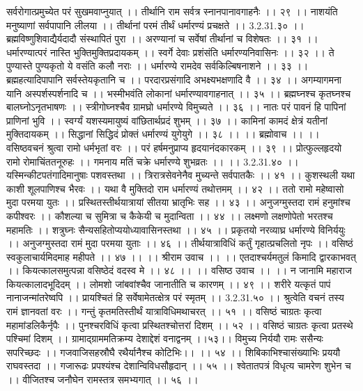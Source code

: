 सर्वरोगात्प्रमुच्येत परं सुखमवाप्नुयात् ।।
तीर्थानि राम सर्वत्र स्नानपानावगाहनैः ।। २९ ।।
नाशयंति मनुष्याणां सर्वपापानि लीलया ।।
तीर्थानां परमं तीर्थं धर्मारण्यं प्रचक्षते ।। 3.2.31.३० ।।
ब्रह्मविष्णुशिवाद्यैर्यदादौ संस्थापितं पुरा ।।
अरण्यानां च सर्वेषां तीर्थानां च विशेषतः ।। ३१ ।।
धर्मारण्यात्परं नास्ति भुक्तिमुक्तिप्रदायकम् ।।
स्वर्गे देवाः प्रशंसंति धर्मारण्यनिवासिनः ।। ३२ ।।
ते पुण्यास्ते पुण्यकृतो ये वसंति कलौ नराः ।।
धर्मारण्ये रामदेव सर्वकिल्बिषनाशने ।। ३३ ।।
ब्रह्महत्यादिपापानि सर्वस्तेयकृतानि च ।।
परदारप्रसंगादि अभक्ष्यभक्षणादि वै ।। ३४ ।।
अगम्यागमना यानि अस्पर्शस्पर्शनादि च ।।
भस्मीभवंति लोकानां धर्मारण्यावगाहनात् ।। ३५ ।।
ब्रह्मघ्नश्च कृतघ्नश्च बालघ्नोऽनृतभाषणः ।।
स्त्रीगोघ्नश्चैव ग्रामघ्रो धर्मारण्ये विमुच्यते ।। ३६ ।।
नातः परं पावनं हि पापिनां प्राणिनां भुवि ।।
स्वर्ग्यं यशस्यमायुष्यं वांछितार्थप्रदं शुभम् ।। ३७ ।।
कामिनां कामदं क्षेत्रं यतीनां मुक्तिदायकम् ।।
सिद्धानां सिद्धिदं प्रोक्तं धर्मारण्यं युगेयुगे ।। ३८ ।।
।। ब्रह्मोवाच ।। ।।
वसिष्ठवचनं श्रुत्वा रामो धर्मभृतां वरः ।।
परं हर्षमनुप्राप्य हृदयानंदकारकम् ।। ३९ ।।
प्रोत्फुल्लहृदयो रामो रोमाचिंततनूरुहः ।।
गमनाय मतिं चक्रे धर्मारण्ये शुभव्रतः ।। ।। 3.2.31.४० ।।
यस्मिन्कीटपतंगादिमानुषाः पशवस्तथा ।।
त्रिरात्रसेवनेनैव मुच्यन्ते सर्वपातकैः ।। ४१ ।।
कुशस्थली यथा काशी शूलपाणिश्च भैरवः ।।
यथा वै मुक्तिदो राम धर्मारण्यं तथोत्तमम् ।। ४२ ।।
ततो रामो महेष्वासो मुदा परमया युतः ।।
प्रस्थितस्तीर्थयात्रायां सीतया भ्रातृभिः सह ।। ४३ ।।
अनुजग्मुस्तदा रामं हनुमांश्च कपीश्वरः ।।
कौशल्या च सुमित्रा च कैकेयी च मुदान्विता ।। ४४ ।।
लक्ष्मणो लक्षणोपेतो भरतश्च महामतिः ।।
शत्रुघ्नः सैन्यसहितोप्ययोध्यावासिनस्तथा ।। ४५ ।।
प्रकृतयो नरव्याघ्र धर्मारण्ये विनिर्ययुः ।।
अनुजग्मुस्तदा रामं मुदा परमया युताः ।। ४६ ।।
तीर्थयात्राविधिं कर्तुं गृहात्प्रचलितो नृपः ।।
वसिष्ठं स्वकुलाचार्यमिदमाह महीपते ।। ४७ ।।
।। श्रीराम उवाच ।। ।।
एतदाश्चर्यमतुलं किमादि द्वारकाभवत् ।।
कियत्कालसमुत्पन्ना वसिष्ठेदं वदस्व मे ।। ४८ ।।
।। वसिष्ठ उवाच ।। ।।
न जानामि महाराज कियत्कालादभूदिदम् ।।
लोमशो जांबवांश्चैव जानातीति च कारणम् ।। ४९ ।।
शरीरे यत्कृतं पापं नानाजन्मांतरेष्वपि ।।
प्रायश्चितं हि सर्वेषामेतत्क्षेत्र परं स्मृतम् ।। 3.2.31.५० ।।
श्रुत्वेति वचनं तस्य रामं ज्ञानवतां वरः ।।
गन्तुं कृतमतिस्तीर्थं यात्राविधिमथाचरत् ।। ५१ ।।
वसिष्ठं चाग्रतः कृत्वा महामांडलिकैर्नृपैः ।।
पुनश्चरविधिं कृत्वा प्रस्थितश्चोत्तरां दिशम् ।। ५२ ।।
वसिष्ठं चाग्रतः कृत्वा प्रतस्थे पश्चिमां दिशम् ।।
ग्रामाद्ग्राममतिक्रम्य देशाद्देशं वनाद्वनम् ।।५३।।
विमुच्य निर्ययौ रामः ससैन्यः सपरिच्छदः ।।
गजवाजिसहस्रौघै रथैर्यानैश्च कोटिभिः।। ।। ५४ ।।
शिबिकाभिश्चासंख्याभिः प्रययौ राघवस्तदा ।।
गजारूढः प्रपश्यंश्च देशान्विविधसौहृदान् ।। ५५ ।।
श्वेतातपत्रं विधृत्य चामरेण शुभेन च ।।
वीजितश्च जनौघेन रामस्तत्र समभ्यगात् ।। ५६ ।।
